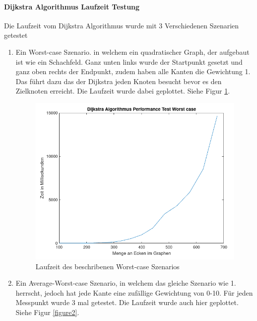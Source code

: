 \documentclass[utf8]{article}
\begin{document}
\paragraph{Dijkstra Algorithmus Laufzeit Testung}
Die Laufzeit vom Dijkstra Algorithmus wurde mit 3 Verschiedenen Szenarien getestet
\begin{enumerate}
  \item Ein Worst-case Szenario. in welchem ein quadratischer Graph, der aufgebaut ist
  wie ein Schachfeld. Ganz unten links wurde der Startpunkt gesetzt und
  ganz oben rechts der Endpunkt, zudem haben alle Kanten die Gewichtung 1.
  Das führt dazu das der Dijkstra jeden Knoten besucht bevor es den Zielknoten
  erreicht. Die Laufzeit wurde dabei geplottet. Siehe Figur \ref{figure1}.

  \begin{figure}[H] 
    \centering
    \includegraphics[width=1\textwidth]{Images/Worstcase.png}
    \caption[]{Laufzeit des beschribenen Worst-case Szenarios}
    \label{figure1}
  \end{figure}

  \item Ein Average-Worst-case Szenario, in welchem das gleiche Szenario wie
  1. herrscht, jedoch hat jede Kante eine zufällige Gewichtung von 0-10.
  Für jeden Messpunkt wurde 3 mal getestet. Die Laufzeit wurde auch hier geplottet.
  Siehe Figur \ref{figure2}.


\end{enumerate}
\end{document}
